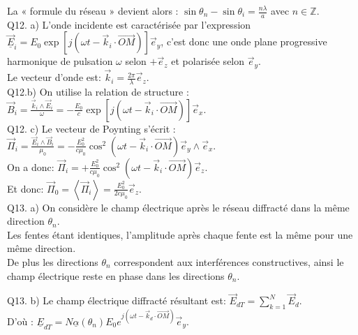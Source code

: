 \documentclass[10pt]{article}
\begin{document}
La « formule du réseau » devient alors : \(\sin \theta_{n}-\sin \theta_{i}=\frac{n \lambda}{a}\) avec \(n \in \mathbb{Z}\).\\
Q12. a) L'onde incidente est caractérisée par l'expression \(\underline{\vec{E}}_{i}=E_{0} \exp \left[j\left(\omega t-\vec{k}_{i} \cdot \overrightarrow{O M}\right)\right] \vec{e}_{y}\), c'est donc une onde plane progressive harmonique de pulsation \(\omega\) selon \(+\vec{e}_{z}\) et polarisée selon \(\vec{e}_{y}\).\\
Le vecteur d'onde est: \(\vec{k}_{i}=\frac{2 \pi}{\lambda} \vec{e}_{z}\).\\
Q12.b) On utilise la relation de structure : \(\vec{B}_{i}=\frac{\vec{k}_{i} \wedge \vec{E}_{i}}{\omega}=-\frac{E_{0}}{c} \exp \left[j\left(\omega t-\vec{k}_{i} \cdot \overrightarrow{O M}\right)\right] \vec{e}_{x}\).\\
Q12. c) Le vecteur de Poynting s'écrit : \(\vec{\Pi}_{i}=\frac{\vec{E}_{i} \wedge \vec{B}_{i}}{\mu_{0}}=-\frac{E_{0}^{2}}{c \mu_{0}} \cos ^{2}\left(\omega t-\vec{k}_{i} \cdot \overrightarrow{O M}\right) \vec{e}_{y} \wedge \vec{e}_{x}\).\\
On a donc: \(\vec{\Pi}_{i}=+\frac{E_{0}^{2}}{c \mu_{0}} \cos ^{2}\left(\omega t-\vec{k}_{i} \cdot \overrightarrow{O M}\right) \vec{e}_{z}\).\\
Et donc: \(\vec{\Pi}_{0}=\left\langle\vec{\Pi}_{i}\right\rangle=\frac{E_{0}^{2}}{2 c \mu_{0}} \vec{e}_{z}\).\\
Q13. a) On considère le champ électrique après le réseau diffracté dans la même direction \(\theta_{n}\).\\
Les fentes étant identiques, l'amplitude après chaque fente est la même pour une même direction.\\
De plus les directions \(\theta_{n}\) correspondent aux interférences constructives, ainsi le champ électrique reste en phase dans les directions \(\theta_{n}\).

Q13. b) Le champ électrique diffracté résultant est: \(\vec{E}_{d T}=\sum_{k=1}^{N} \vec{E}_{d}\).\\
D'où : \(\underline{E}_{d T}=N \underline{\alpha}\left(\theta_{n}\right) E_{0} e^{j\left(\omega t-\vec{k}_{d} \cdot \overrightarrow{O M}\right)} \vec{e}_{y}\).
\end{document}
